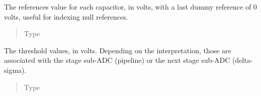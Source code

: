 \documentclass[letterpaper,10pt,english]{sphinxmanual}
\begin{document}
\begin{fulllineitems}
\begin{fulllineitems}
\begin{quote}
\begin{description}
\end{description}\end{quote}

\end{fulllineitems}


\begin{fulllineitems}
\label{\detokenize{gen:calib.gen.StageParameters.refs_ext}}
The references value for each capacitor, in volts, with a last dummy
reference of 0 volts, useful for indexing null references.
\begin{quote}\begin{description}
\item[{Type}] \leavevmode
{}

\end{description}\end{quote}

\end{fulllineitems}


\begin{fulllineitems}
\label{\detokenize{gen:calib.gen.StageParameters.thres}}
The threshold values, in volts. Depending on the interpretation, those
are associated with the stage sub-ADC (pipeline) or the next stage
sub-ADC (delta-sigma).
\begin{quote}\begin{description}
\item[{Type}] \leavevmode
{}

\end{description}\end{quote}

\end{fulllineitems}


\end{fulllineitems}

\end{document}
